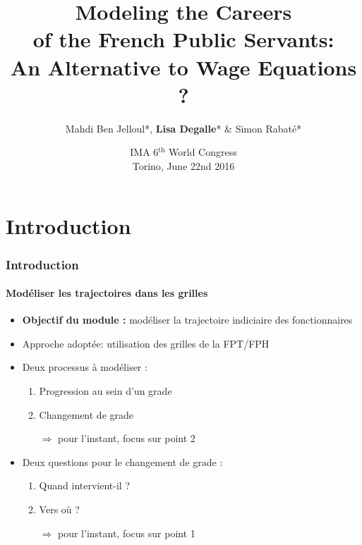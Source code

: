 \documentclass[xcolor=table,ignorenonframetext,12pt]{beamer}
\title{Modeling the Careers \\ of the French Public Servants: \\ An Alternative to Wage Equations ?}
\author{ Mahdi Ben Jelloul*, \textbf{Lisa Degalle}* \& Simon Rabaté*}
\institute{
  \inst{*} Institut of Public Policy
}
\date{IMA 6$^{\text{th}}$ World Congress\\
	Torino, June 22nd 2016}
\newenvironment{choixmarges}[2]{\begin{list}{}{%
\setlength{\topsep}{0pt}%
\setlength{\leftmargin}{0pt}%
\setlength{\rightmargin}{0pt}%
\setlength{\listparindent}{\parindent}%
\setlength{\itemindent}{\parindent}%
\setlength{\parsep}{0pt plus 1pt}%
\addtolength{\leftmargin}{#1}%
\addtolength{\rightmargin}{#2}%
}\item }{\end{list}}
\begin{document}
\frame{\maketitle}




\section{Introduction}


\begin{frame}
\frametitle{Introduction}
\framesubtitle{Modéliser les trajectoires dans les grilles}


\begin{choixmarges}{-0.5cm}{-0.5cm}



\begin{itemize}
\item \textbf{Objectif du module :} modéliser la trajectoire indiciaire des fonctionnaires
\vspace{0.1cm}

\item Approche adoptée: utilisation des grilles de la FPT/FPH

\vspace{0.1cm}
\item Deux processus à modéliser : 
	\begin{enumerate}
	\item Progression au sein d'un grade \\
	\item Changement de grade
	\item[$\Rightarrow$] pour l'instant, focus sur point 2
	\end{enumerate}

\vspace{0.1cm}
\item Deux questions pour le changement de grade : 
	\begin{enumerate}
	\item Quand intervient-il ? 
	\item Vers où ? 
	\item[$\Rightarrow$]  pour l'instant, focus sur point 1
	\end{enumerate}

	
\end{itemize}


\end{choixmarges}
\end{frame}
\end{document}
